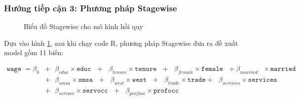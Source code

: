 \subsubsection*{Hướng tiếp cận 3: Phương pháp Stagewise}
\begin{figure}[H]
	\centering
	 \hfill
	\caption{Biểu đồ Stagewise cho mô hình hồi quy}
	\label{stagewise}
\end{figure}

Dựa vào hình \ref{stagewise}, sau khi chạy code R, phương pháp Stagewise đưa ra đề xuất model gồm 11 biến:

\begin{equation*}
	\begin{split}
		\texttt{wage } = \beta_0 &+ \text{ } \beta_{educ}\times \texttt{educ} \text{ } + \text{ } \beta_{tenure} \times \texttt{tenure} \text{ }+\text{ }\beta_{female} \times \texttt{female} \text{ } 
		+ \beta_{married} \text{ } \times \texttt{married} \text{ } \\
		&+\text{ }\beta_{smsa} \times\texttt{smsa}\text{ }  
		+ \text{ }\beta_{west} \times \texttt{west} \text{ } 
		+ \text{ }\beta_{trade}\times \texttt{trade} + \text{ }\beta_{services} \times \texttt{services} \text{ } \\
		&+ \text{ }\beta_{servocc} \times \texttt{servocc} \text{ } + \text{ }\beta_{profocc}\times \texttt{profocc}
	\end{split}
\end{equation*}

